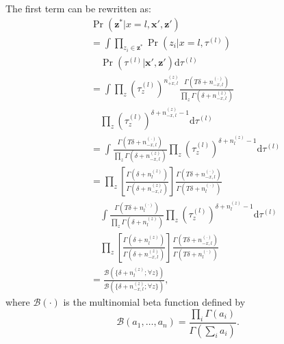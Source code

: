 The first term can be rewritten as:
\begin{eqnarray*}
  && \Pr(\mathbf{z}^*|x = l, \mathbf{x}', \mathbf{z}') \nonumber \\
  && = \int \prod_{z_i \in \mathbf{z}^*} \Pr(z_i|x = l, \tau^{(l)}) \nonumber\\
  && \quad \Pr(\tau^{(l)}|\mathbf{x}', \mathbf{z}') \mathrm{d}\tau^{(l)} \nonumber \\
  && = \int \prod_z \left(\tau^{(l)}_z\right)^{n_{+x,l}^{(z)}} \frac{\Gamma(T \delta + n_{-x,l}^{(\cdot)})}{\prod_z \Gamma(\delta + n_{-x,l}^{(z)})} \nonumber\\
  && \quad \prod_z \left(\tau^{(l)}_z\right)^{\delta + n_{-x,l}^{(z)} - 1} \mathrm{d}\tau^{(l)} \\
  && = \int \frac{\Gamma(T \delta + n_{-x,l}^{(\cdot)})}{\prod_z \Gamma(\delta + n_{-x,l}^{(z)})} \prod_z \left(\tau^{(l)}_z\right)^{\delta + n_l^{(z)} - 1} \mathrm{d}\tau^{(l)} \\
  && = \prod_z \left[\frac{\Gamma(\delta + n_l^{(z)})}{\Gamma(\delta + n_{-x,l}^{(z)})}\right] \frac{\Gamma(T \delta + n_{-x,l}^{(\cdot)})}{\Gamma(T \delta + n_l^{(\cdot)})} \nonumber \\
  && \quad \int \frac{\Gamma(T \delta + n_l^{(\cdot)})}{\prod_z \Gamma(\delta + n_l^{(z)})} \prod_z \left(\tau^{(l)}_z\right)^{\delta + n_l^{(z)} - 1} \mathrm{d}\tau^{(l)} \\
  && \quad \prod_z \left[\frac{\Gamma(\delta + n_l^{(z)})}{\Gamma(\delta + n_{-x,l}^{(z)})}\right] \frac{\Gamma(T \delta + n_{-x,l}^{(\cdot)})}{\Gamma(T \delta + n_l^{(\cdot)})} \\
  && = \frac{\mathcal{B}(\{\delta + n_l^{(z)}; \forall z\})}{\mathcal{B}(\{\delta + n_{-x,l}^{(z)}; \forall z\})},
\end{eqnarray*}
where $\mathcal{B}(\cdot)$ is the multinomial beta function defined by
\[\mathcal{B}(a_1, \ldots, a_n) = \frac{\prod_i \Gamma(a_i)}{\Gamma(\sum_i
a_i)}. \]
